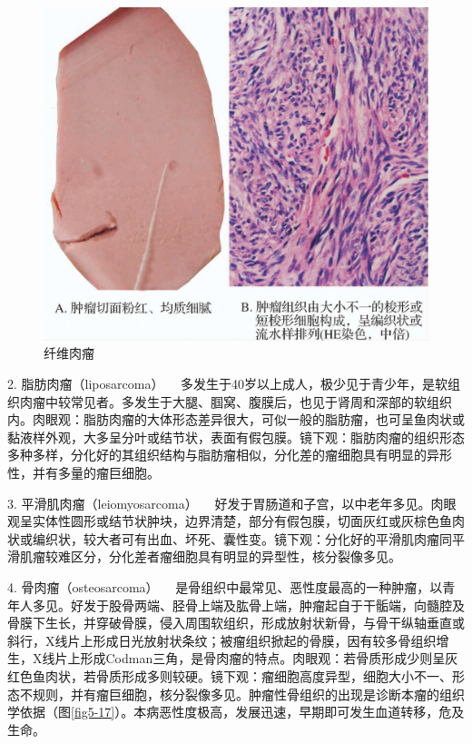 \begin{figure}[!htbp]
 \centering
 \includegraphics{./images/Image00085.jpg}
 \caption{纤维肉瘤}
 \label{fig5-16}
  \end{figure}

{2. 脂肪肉瘤（liposarcoma）}
　多发生于40岁以上成人，极少见于青少年，是软组织肉瘤中较常见者。多发生于大腿、腘窝、腹膜后，也见于肾周和深部的软组织内。肉眼观：脂肪肉瘤的大体形态差异很大，可似一般的脂肪瘤，也可呈鱼肉状或黏液样外观，大多呈分叶或结节状，表面有假包膜。镜下观：脂肪肉瘤的组织形态多种多样，分化好的其组织结构与脂肪瘤相似，分化差的瘤细胞具有明显的异形性，并有多量的瘤巨细胞。

{3. 平滑肌肉瘤（leiomyosarcoma）}
　好发于胃肠道和子宫，以中老年多见。肉眼观呈实体性圆形或结节状肿块，边界清楚，部分有假包膜，切面灰红或灰棕色鱼肉状或编织状，较大者可有出血、坏死、囊性变。镜下观：分化好的平滑肌肉瘤同平滑肌瘤较难区分，分化差者瘤细胞具有明显的异型性，核分裂像多见。

{4. 骨肉瘤（osteosarcoma）}
　是骨组织中最常见、恶性度最高的一种肿瘤，以青年人多见。好发于股骨两端、胫骨上端及肱骨上端，肿瘤起自于干骺端，向髓腔及骨膜下生长，并穿破骨膜，侵入周围软组织，形成放射状新骨，与骨干纵轴垂直或斜行，X线片上形成日光放射状条纹；被瘤组织掀起的骨膜，因有较多骨组织增生，X线片上形成Codman三角，是骨肉瘤的特点。肉眼观：若骨质形成少则呈灰红色鱼肉状，若骨质形成多则较硬。镜下观：瘤细胞高度异型，细胞大小不一、形态不规则，并有瘤巨细胞，核分裂像多见。肿瘤性骨组织的出现是诊断本瘤的组织学依据（图\ref{fig5-17}）。本病恶性度极高，发展迅速，早期即可发生血道转移，危及生命。

